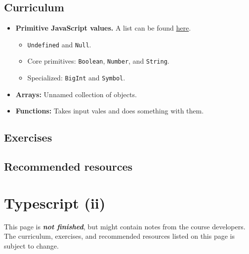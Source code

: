 \documentclass[
  letterpaper,
  DIV=11,
  numbers=noendperiod]{scrreprt}
\providecommand{\tightlist}{%
  \setlength{\itemsep}{0pt}\setlength{\parskip}{0pt}}\usepackage{longtable,booktabs,array}
\begin{document}
\hypertarget{curriculum-7}{%
\section{Curriculum}\label{curriculum-7}}

\begin{itemize}
\tightlist
\item
  \textbf{Primitive JavaScript values.} A list can be found
  \href{https://developer.mozilla.org/en-US/docs/Web/JavaScript/Data_structures}{here}.

  \begin{itemize}
  \tightlist
  \item
    \texttt{Undefined} and \texttt{Null}.
  \item
    Core primitives: \texttt{Boolean}, \texttt{Number}, and
    \texttt{String}.
  \item
    Specialized: \texttt{BigInt} and \texttt{Symbol}.
  \end{itemize}
\item
  \textbf{Arrays:} Unnamed collection of objects.
\item
  \textbf{Functions:} Takes input vales and does something with them.
\end{itemize}

\hypertarget{exercises-2}{%
\section{Exercises}\label{exercises-2}}

\hypertarget{recommended-resources-5}{%
\section{Recommended resources}\label{recommended-resources-5}}


\hypertarget{typescript-ii}{%
\chapter{Typescript (ii)}\label{typescript-ii}}

\begin{tcolorbox}[enhanced jigsaw, colbacktitle=quarto-callout-important-color!10!white, bottomrule=.15mm, toprule=.15mm, colback=white, coltitle=black, bottomtitle=1mm, colframe=quarto-callout-important-color-frame, opacitybacktitle=0.6, titlerule=0mm, left=2mm, title=\textcolor{quarto-callout-important-color}{\faExclamation}\hspace{0.5em}{Important}, opacityback=0, arc=.35mm, leftrule=.75mm, rightrule=.15mm, toptitle=1mm, breakable]

This page is \textbf{\emph{not finished}}, but might contain notes from
the course developers. The curriculum, exercises, and recommended
resources listed on this page is subject to change.

\end{tcolorbox}
\end{document}
